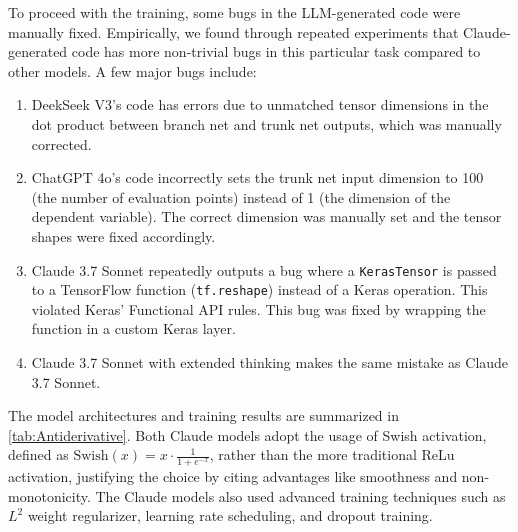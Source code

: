 \documentclass{article}
\begin{document}
To proceed with the training, some bugs in the LLM-generated code were manually fixed. Empirically, we found through repeated experiments that Claude-generated code has more non-trivial bugs in this particular task compared to other models. A few major bugs include:
\begin{enumerate}
    \item DeekSeek V3's code has errors due to unmatched tensor dimensions in the dot product between branch net and trunk net outputs, which was manually corrected.
    \item ChatGPT 4o's code incorrectly sets the trunk net input dimension to 100 (the number of evaluation points) instead of 1 (the dimension of the dependent variable). The correct dimension was manually set and the tensor shapes were fixed accordingly. 
    \item Claude 3.7 Sonnet repeatedly outputs a bug where a \texttt{KerasTensor} is passed to a TensorFlow function (\texttt{tf.reshape}) instead of a Keras operation. This violated Keras' Functional API rules. This bug was fixed by wrapping the function in a custom Keras layer.
    \item Claude 3.7 Sonnet with extended thinking makes the same mistake as Claude 3.7 Sonnet. 
\end{enumerate}

The model architectures and training results are summarized in \autoref{tab:Antiderivative}. Both Claude models adopt the usage of Swish activation, defined as $\text{Swish}(x) = x \cdot \frac{1}{1 + e^{-x}}$, rather than the more traditional ReLu activation, justifying the choice by citing advantages like smoothness and non-monotonicity. The Claude models also used advanced  training techniques such as $L^2$ weight regularizer, learning rate scheduling, and dropout training. 
\end{document}
